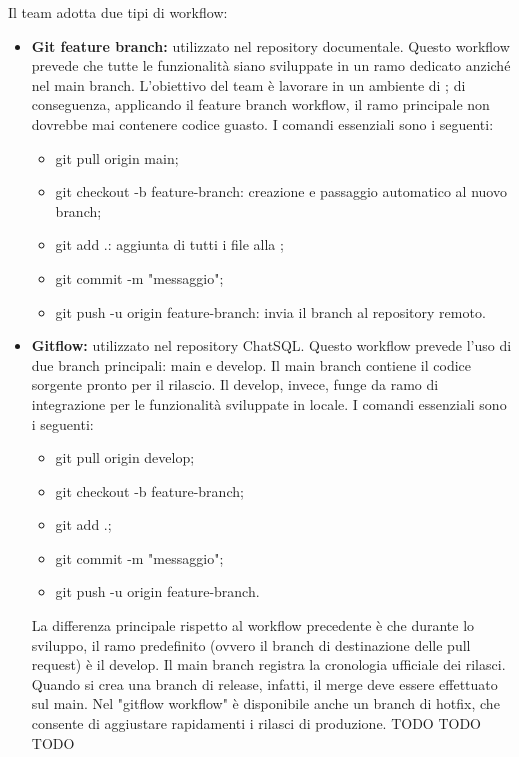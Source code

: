 \par Il team adotta due tipi di workflow:
\begin{itemize}
  \item \textbf{Git feature branch:} utilizzato nel repository documentale. Questo workflow prevede che tutte le funzionalità siano sviluppate in un ramo dedicato anziché nel main branch. L'obiettivo del team è lavorare in un ambiente di ; di conseguenza, applicando il feature branch workflow, il ramo principale non dovrebbe mai contenere codice guasto. I comandi essenziali sono i seguenti:
  \begin{itemize}
    \item git pull origin main;
    \item git checkout -b feature-branch: creazione e passaggio automatico al nuovo branch;
    \item git add .: aggiunta di tutti i file alla ;
    \item git commit -m "messaggio";
    \item git push -u origin feature-branch: invia il branch al repository remoto.
  \end{itemize}
  \item \textbf{Gitflow:} utilizzato nel repository ChatSQL. Questo workflow prevede l'uso di due branch principali: main e develop. Il main branch contiene il codice sorgente pronto per il rilascio. Il develop, invece, funge da ramo di integrazione per le funzionalità sviluppate in locale. I comandi essenziali sono i seguenti:
  \begin{itemize}
    \item git pull origin develop;
    \item git checkout -b feature-branch;
    \item git add .;
    \item git commit -m "messaggio";
    \item git push -u origin feature-branch.
\end{itemize}
\par La differenza principale rispetto al workflow precedente è che durante lo sviluppo, il ramo predefinito (ovvero il branch di destinazione delle pull request) è il develop. Il main branch registra la cronologia ufficiale dei rilasci. Quando si crea una branch di release, infatti, il merge deve essere effettuato sul main. Nel "gitflow workflow" è disponibile anche un branch di hotfix, che consente di aggiustare rapidamenti i rilasci di produzione.
TODO
TODO
TODO



\end{itemize}
